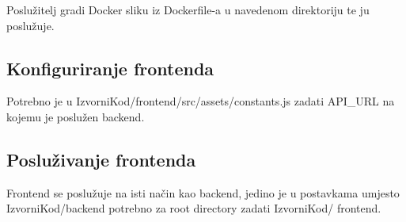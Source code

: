
Poslužitelj gradi Docker sliku iz Dockerfile-a u navedenom direktoriju te ju 
poslužuje.

\subsection{Konfiguriranje frontenda}

Potrebno je u IzvorniKod/frontend/src/assets/constants.js zadati API_URL na 
kojemu je poslužen backend.

\subsection{Posluživanje frontenda}

Frontend se poslužuje na isti način kao backend, jedino je u postavkama 
umjesto IzvorniKod/backend potrebno za root directory zadati IzvorniKod/
frontend.

\eject 